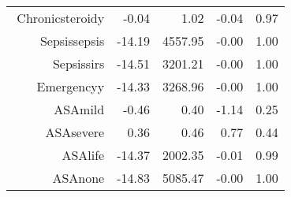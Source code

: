 \begin{tabular}{rrrrr}
$$  Chronic\-steroid\-y & -0.04 & 1.02 & -0.04 & 0.97 \\ 
  Sepsis\-sepsis & -14.19 & 4557.95 & -0.00 & 1.00 \\ 
  Sepsis\-sirs & -14.51 & 3201.21 & -0.00 & 1.00 \\ 
  Emergency\-y & -14.33 & 3268.96 & -0.00 & 1.00 \\ 
  ASA\-mild & -0.46 & 0.40 & -1.14 & 0.25 \\ 
  ASA\-severe & 0.36 & 0.46 & 0.77 & 0.44 \\ 
  ASA\-life & -14.37 & 2002.35 & -0.01 & 0.99 \\ 
  ASA\-none & -14.83 & 5085.47 & -0.00 & 1.00 \\ 
   \hline
\end{tabular}

